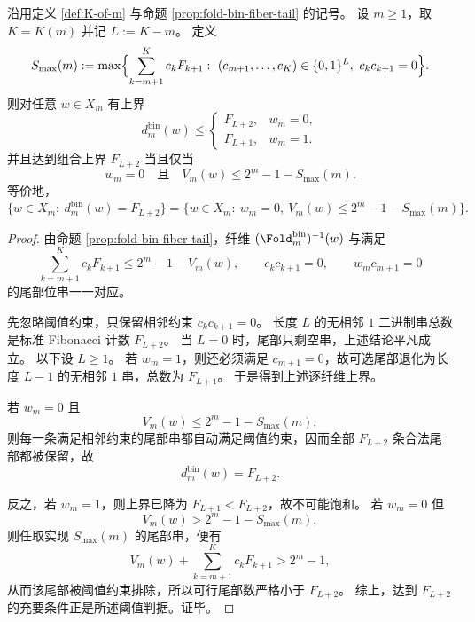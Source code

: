 \begin{theorem}\label{thm:xi-foldbin-fiberwise-saturation-sector-criterion}
沿用定义 \ref{def:K-of-m} 与命题 \ref{prop:fold-bin-fiber-tail} 的记号。
设 \(m\ge 1\)，取 \(K=K(m)\) 并记 \(L:=K-m\)。
定义
\[
S_{\max}(m):=
\max\Bigl\{
\sum_{k=m+1}^{K}c_kF_{k+1}:
\ (c_{m+1},\dots,c_K)\in\{0,1\}^{L},\ c_kc_{k+1}=0
\Bigr\}.
\]
则对任意 \(w\in X_m\) 有上界
\[
d_m^{\mathrm{bin}}(w)\le
\begin{cases}
F_{L+2},& w_m=0,\\
F_{L+1},& w_m=1.
\end{cases}
\]
并且达到组合上界 \(F_{L+2}\) 当且仅当
\[
w_m=0
\quad\text{且}\quad
V_m(w)\le 2^m-1-S_{\max}(m).
\]
等价地，
\[
\{w\in X_m:\ d_m^{\mathrm{bin}}(w)=F_{L+2}\}
=
\{w\in X_m:\ w_m=0,\ V_m(w)\le 2^m-1-S_{\max}(m)\}.
\]
\end{theorem}
\begin{proof}
由命题 \ref{prop:fold-bin-fiber-tail}，纤维
\(
(\Fold_m^{\mathrm{bin}})^{-1}(w)
\)
与满足
\[
\sum_{k=m+1}^{K}c_kF_{k+1}\le 2^m-1-V_m(w),
\qquad
c_kc_{k+1}=0,
\qquad
w_mc_{m+1}=0
\]
的尾部位串一一对应。

先忽略阈值约束，只保留相邻约束 \(c_kc_{k+1}=0\)。
长度 \(L\) 的无相邻 \(1\) 二进制串总数是标准 Fibonacci 计数 \(F_{L+2}\)。
当 \(L=0\) 时，尾部只剩空串，上述结论平凡成立。
以下设 \(L\ge 1\)。
若 \(w_m=1\)，则还必须满足 \(c_{m+1}=0\)，故可选尾部退化为长度 \(L-1\) 的无相邻 \(1\) 串，总数为 \(F_{L+1}\)。
于是得到上述逐纤维上界。

若 \(w_m=0\) 且
\[
V_m(w)\le 2^m-1-S_{\max}(m),
\]
则每一条满足相邻约束的尾部串都自动满足阈值约束，因而全部 \(F_{L+2}\) 条合法尾部都被保留，故
\[
d_m^{\mathrm{bin}}(w)=F_{L+2}.
\]

反之，若 \(w_m=1\)，则上界已降为 \(F_{L+1}<F_{L+2}\)，故不可能饱和。
若 \(w_m=0\) 但
\[
V_m(w)>2^m-1-S_{\max}(m),
\]
则任取实现 \(S_{\max}(m)\) 的尾部串，便有
\[
V_m(w)+\sum_{k=m+1}^{K}c_kF_{k+1}>2^m-1,
\]
从而该尾部被阈值约束排除，所以可行尾部数严格小于 \(F_{L+2}\)。
综上，达到 \(F_{L+2}\) 的充要条件正是所述阈值判据。证毕。
\end{proof}

